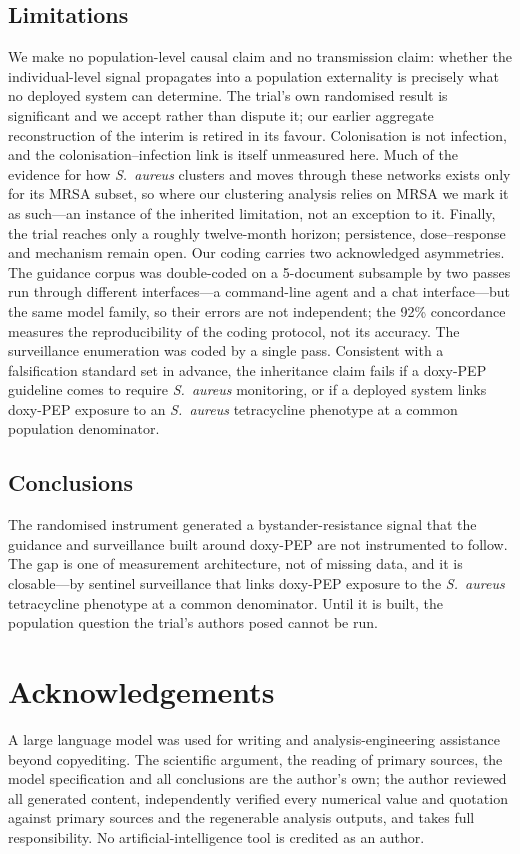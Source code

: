\documentclass[12pt,a4paper]{article}
\newcommand{\sa}{\emph{S.~aureus}}
\begin{document}
\subsection*{Limitations}
We make no population-level causal claim and no transmission claim: whether the
individual-level signal propagates into a population externality is precisely what
no deployed system can determine. The trial's own randomised result is
significant and we accept rather than dispute it; our earlier aggregate
reconstruction of the interim is retired in its favour. Colonisation is not
infection, and the colonisation--infection link is itself unmeasured here. Much of
the evidence for how \sa{} clusters and moves through these networks exists only
for its MRSA subset, so where our clustering analysis relies on MRSA we mark it as
such---an instance of the inherited limitation, not an exception to it. Finally,
the trial reaches only a roughly twelve-month horizon; persistence, dose--response
and mechanism remain open. Our coding carries two acknowledged asymmetries. The guidance corpus was
double-coded on a 5-document subsample by two passes run through different
interfaces---a command-line agent and a chat interface---but the same model
family, so their errors are not independent; the 92\% concordance measures the
reproducibility of the coding protocol, not its accuracy. The surveillance
enumeration was coded by a single pass. Consistent with a
falsification standard set in advance, the inheritance claim fails if a doxy-PEP
guideline comes to require
\sa{} monitoring, or if a deployed system links doxy-PEP exposure to an \sa{}
tetracycline phenotype at a common population denominator.

\subsection*{Conclusions}
The randomised instrument generated a bystander-resistance signal that the
guidance and surveillance built around doxy-PEP are not instrumented to follow.
The gap is one of measurement architecture, not of missing data, and it is
closable---by sentinel surveillance that links doxy-PEP exposure to the \sa{}
tetracycline phenotype at a common denominator. Until it is built, the population
question the trial's authors posed cannot be run.

\section*{Acknowledgements}
A large language model was used for writing and analysis-engineering assistance
beyond copyediting. The scientific argument, the reading of primary sources, the
model specification and all conclusions are the author's own; the author reviewed
all generated content, independently verified every numerical value and quotation
against primary sources and the regenerable analysis outputs, and takes full
responsibility. No artificial-intelligence tool is credited as an author.
\end{document}

